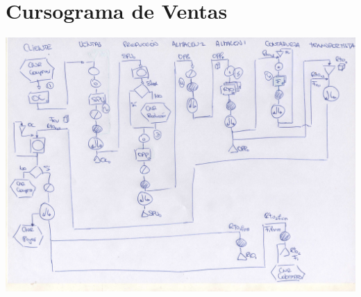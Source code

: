 \pagebreak
\section{Cursograma de Ventas}
\includegraphics[scale=0.65, angle=90]{Empresa/Circuitos/Ventas/ventas.jpg}

\pagebreak
